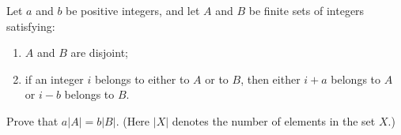 Let $a$ and $b$ be positive integers, and let $A$ and $B$ be finite sets of integers satisfying:
\begin{enumerate}[label=(\roman*)]
	\item $A$ and $B$ are disjoint;
	\item if an integer $i$ belongs to either to $A$ or to $B$, then either $i+a$ belongs to $A$ or $i-b$ belongs to $B$.
\end{enumerate}

Prove that $a\left\lvert A \right\rvert = b \left\lvert B \right\rvert$. (Here $\left\lvert X \right\rvert$ denotes the number of elements in the set $X$.)
